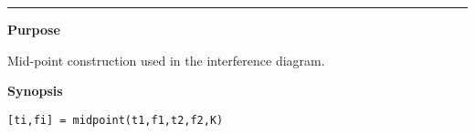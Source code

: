 

\hspace*{-1.6cm}{\Large \bf midscomp}

\vspace*{-.4cm}
\hspace*{-1.6cm}\rule[0in]{16.5cm}{.02cm}
\vspace*{.2cm}


{\bf \large {}\selectfont Purpose}\\
\hspace*{1.5cm}
\begin{minipage}[t]{13.5cm}
Mid-point construction used in the interference diagram. 
\end{minipage}
\vspace*{.5cm}


{\bf \large {}\selectfont Synopsis}\\
\hspace*{1.5cm}
\begin{minipage}[t]{13.5cm}
\begin{verbatim}
[ti,fi] = midpoint(t1,f1,t2,f2,K)
\end{verbatim}
\end{minipage}
\vspace*{.5cm}



